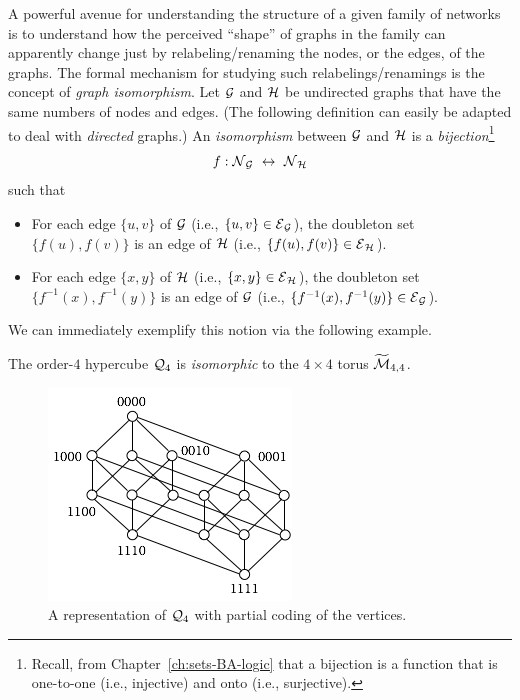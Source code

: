 A powerful avenue for understanding the structure of a given family of
networks is to understand how the perceived ``shape'' of graphs in the
family can apparently change just by relabeling/renaming the nodes, or
the edges, of the graphs.  The formal mechanism for studying such
relabelings/renamings is the concept of {\it graph isomorphism}.
 Let $\mbox{$\cal G$}$ and $\mbox{$\cal H$}$ be undirected graphs that
have the same numbers of nodes and edges.  (The following definition
can easily be adapted to deal with {\em directed} graphs.)  An {\it
  isomorphism} between $\mbox{$\cal G$}$ and $\mbox{$\cal H$}$ is a {\em
  bijection}\footnote{Recall, from Chapter~\ref{ch:sets-BA-logic} that
  a bijection is a function that is one-to-one (i.e., injective) and
  onto (i.e., surjective).}
\[ f: \mbox{$\cal N$}_{\mbox{{\scriptsize $\cal G$}}} \ \leftrightarrow \ \mbox{$\cal N$}_{\mbox{{\scriptsize $\cal H$}}} \]
such that
\begin{itemize}
\item
For each edge $\{ u,v \}$ of $\mbox{$\cal G$}$ (i.e., $\{ u,v \} \in \mbox{$\cal E$}_{\mbox{{\scriptsize $\cal G$}}}$),
the doubleton set $\{ f(u), f(v) \}$ is an edge of $\mbox{$\cal H$}$ (i.e.,
$\{ f(u), f(v) \} \in \mbox{$\cal E$}_{\mbox{{\scriptsize $\cal H$}}}$).
\item
For each edge $\{ x,y \}$ of $\mbox{$\cal H$}$ (i.e., $\{ x,y \} \in \mbox{$\cal E$}_{\mbox{{\scriptsize $\cal H$}}}$),
the doubleton set $\{ f^{-1}(x), f^{-1}(y) \}$ is an edge of $\mbox{$\cal G$}$ (i.e.,
$\{ f^{-1}(x), f^{-1}(y) \} \in \mbox{$\cal E$}_{\mbox{{\scriptsize $\cal G$}}}$).
\end{itemize}
We can immediately exemplify this notion via the following example.

\begin{prop}
The order-$4$ hypercube $\mbox{$\cal Q$}_4$ is \textit{isomorphic} to the $4 \times
4$ torus $\widetilde{\mbox{$\cal M$}}_{4,4}$.
\end{prop}

\begin{figure}[hbt]
\begin{center}
       \includegraphics[scale=0.6]{FiguresGraph/Isomorphism1}
       \caption{A representation of $\mbox{$\cal Q$}_4$ with partial coding of the vertices.}
  \label{fig:isomorphism1}
\end{center}
\end{figure}

